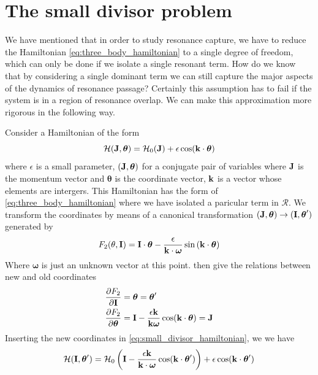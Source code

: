 \documentclass[ twoside,openright,titlepage,numbers=noenddot,headinclude,%
                footinclude=true,cleardoublepage=empty,abstractoff, %
                BCOR=5mm,paper=a4,fontsize=11pt,%
                american,%
                ]{scrreprt}
\begin{document}
\section{The small divisor problem}
\label{sec:small_divisor}
We have mentioned that in order to study resonance capture, we have
to reduce the Hamiltonian \ref{eq:three_body_hamiltonian} to a 
single degree of freedom, which can only be done if we isolate 
a single resonant term. How do we know that by considering a single
dominant term we can still capture the major aspects of the dynamics
of resonance passage? Certainly this assumption has to fail if
the system is in a region of resonance overlap. We can make this 
approximation more rigorous in the following way.

Consider a Hamiltonian of the form
\begin{equation}
    \mathcal{H}(\boldsymbol{\mathbf{J}},\boldsymbol{\theta})=\mathcal{H}_0(\boldsymbol{\mathbf{J}})+
    \epsilon\cos(\boldsymbol{\mathbf{k}}\cdot\boldsymbol{\theta})
    \label{eq:small_divisor_hamiltonian}
\end{equation}
where $\epsilon$ is a small parameter, $(\boldsymbol{\mathbf{J}},\boldsymbol{\theta})$
for a conjugate pair of variables where $\boldsymbol{\mathbf{J}}$ is the momentum
vector and $\boldsymbol{\theta}$ is the coordinate vector, $\boldsymbol{\mathbf{k}}$ is
a vector whose elements are intergers. This Hamiltonian has the form of
\cref{eq:three_body_hamiltonian} where we have isolated a paricular term
in $\mathcal{R}$. We transform the coordinates
by means of a canonical transformation $(\boldsymbol{\mathbf{J}},\boldsymbol{\theta})
\rightarrow (\boldsymbol{\mathbf{I}},\boldsymbol{\theta}')$ generated by
\begin{equation}
    F_2(\theta, \boldsymbol{\mathbf{I}})=\boldsymbol{\mathbf{I}}\cdot\boldsymbol{\theta}
    - \frac{\epsilon}{\boldsymbol{\mathbf{k}}\cdot\boldsymbol{\omega}} \sin{(\boldsymbol{\mathbf{k}}\cdot
    \boldsymbol{\theta})}
\end{equation}
Where $\boldsymbol{\omega}$ is just an unknown vector at this point.
 then give the relations between new and old
coordinates
\begin{align}
    \frac{\partial F_2}{\partial \boldsymbol{\mathbf{I}}} &=\boldsymbol{\theta}
    =\boldsymbol{\theta}'\\
    \frac{\partial F_2}{\partial \boldsymbol{\theta}}&=\boldsymbol{\mathbf{I}}
    - \frac{\epsilon\boldsymbol{\mathbf{k}}}{\boldsymbol{\mathbf{k}}\boldsymbol{\omega}}\cos
    (\boldsymbol{\mathbf{k}}\cdot\boldsymbol{\theta})=\boldsymbol{\mathbf{J}}
    \label{eq:small_divisor}
\end{align}
Inserting the new coordinates in \cref{eq:small_divisor_hamiltonian}, we
we have
\begin{equation}
    \mathcal{H}(\boldsymbol{\mathbf{I}},\boldsymbol{\theta}')=\mathcal{H}_0\left(
\boldsymbol{\mathbf{I}} - \frac{\epsilon\boldsymbol{\mathbf{k}}}{\boldsymbol{\mathbf{k}}\cdot\boldsymbol{\omega}}\cos
    (\boldsymbol{\mathbf{k}}\cdot\boldsymbol{\theta}')\right) +\epsilon\cos
    (\boldsymbol{\mathbf{k}}\cdot\boldsymbol{\theta}')
\end{equation}
\end{document}
